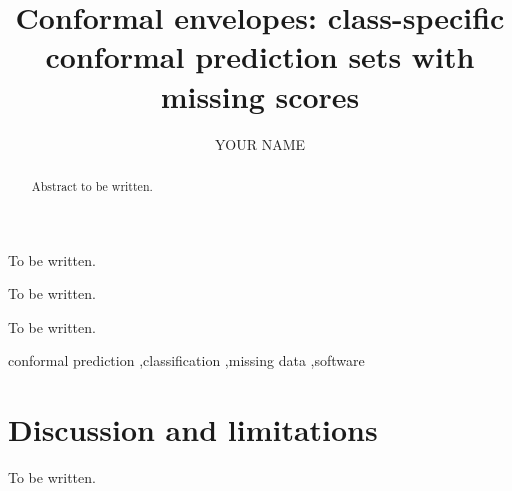 \documentclass[a4paper,fleqn]{cas-sc}
\begin{document}
\let\WriteBookmarks\relax
\def\floatpagepagefraction{1}
\def\textpagefraction{.001}


\title[mode=title]{Conformal envelopes: class-specific conformal prediction sets with missing scores}

\author[1]{YOUR NAME}
\cormark[1]

\begin{abstract}
Abstract to be written.
\end{abstract}

\begin{highlights}
\item To be written.
\item To be written.
\item To be written.
\end{highlights}

\begin{keywords}
conformal prediction \sep classification \sep missing data \sep software
\end{keywords}

\maketitle







\section{Discussion and limitations}\label{sec:discussion}
To be written.

\printcredits



\end{document}
